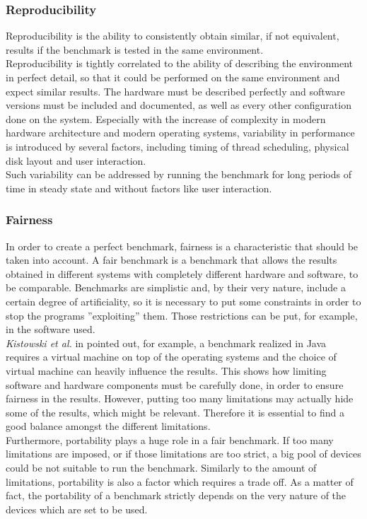 \subsubsection{Reproducibility}
Reproducibility is the ability to consistently obtain similar, if not equivalent, results if the benchmark is tested in the same environment. \cite{how_to_bench}\\
Reproducibility is tightly correlated to the ability of describing the environment in perfect detail, so that it could be performed on the same environment and expect similar results. The hardware must be described perfectly and software versions must be included and documented, as well as every other configuration done on the system. Especially with the increase of complexity in modern hardware architecture and modern operating systems, variability in performance is introduced by several factors, including timing of thread scheduling, physical disk layout and user interaction. \cite{how_to_bench}\\
Such variability can be addressed by running the benchmark for long periods of time in steady state and without factors like user interaction. 


\subsubsection{Fairness}
In order to create a perfect benchmark, fairness is a characteristic that should be taken into account. A fair benchmark is a benchmark that allows the results obtained in different systems with completely different hardware and software, to be comparable. Benchmarks are simplistic and, by their very nature, include a certain degree of artificiality, so it is necessary to put some constraints in order to stop the programs ''exploiting'' them. Those restrictions can be put, for example, in the software used.\\ 
\textit{Kistowski et al.} in \cite{how_to_bench} pointed out, for example, a benchmark realized in Java requires a virtual machine on top of the operating systems and the choice of virtual machine can heavily influence the results. This shows how limiting software and hardware components must be carefully done, in order to ensure fairness in the results. However, putting too many limitations may actually hide some of the results, which might be relevant. \cite{how_to_bench} Therefore it is essential to find a good balance amongst the different limitations. \\
Furthermore, portability plays a huge role in a fair benchmark. If too many limitations are imposed, or if those limitations are too strict, a big pool of devices could be not suitable to run the benchmark. Similarly to the amount of limitations, portability is also a factor which requires a trade off. As a matter of fact, the portability of a benchmark strictly depends on the very nature of the devices which are set to be used. 

